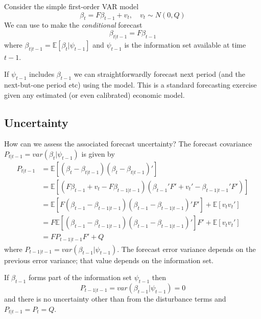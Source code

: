 \documentclass[
  letterpaper,
]{book}
\begin{document}
Consider the simple first-order VAR model \begin{equation}
  \beta_t = F\beta_{t-1}+v_{t},\quad v_t\sim N(0,Q)
\end{equation} We can use to make the \emph{conditional} forecast
\begin{equation}
  \beta_{t|t-1} = F\beta_{t-1}
\end{equation} where \(\beta_{t|t-1}= \mathbb{E}[\beta_t|\psi_{t-1}]\)
and \(\psi_{t-1}\) is the information set available at time \(t-1\).

If \(\psi_{t-1}\) includes \(\beta_{t-1}\) we can straightforwardly
forecast next period (and the next-but-one period etc) using the model.
This is a standard forecasting exercise given any estimated (or even
calibrated) economic model.

\hypertarget{uncertainty}{%
\subsection{Uncertainty}\label{uncertainty}}

How can we assess the associated forecast uncertainty? The forecast
covariance \(P_{t|t-1} = var(\beta_t|\psi_{t-1})\) is given by
\begin{align*}
P_{t|t-1} &= \mathbb{E}\left[ (\beta_t - \beta_{t|t-1})(\beta_t-\beta_{t|t-1})'\right]   \\
  &= \mathbb{E}\left[ (F\beta_{t-1}+v_t-F\beta_{t-1|t-1}) \left(\beta_{t-1}'F'+v_t'-\beta_{t-1|t-1}'F'\right) \right] \\
&= \mathbb{E}\left[ F\left(\beta _{t-1}-\beta _{t-1|t-1}\right) \left( \beta_{t-1}-\beta _{t-1|t-1}\right) ' F' \right] + \mathbb{E}[v_t v_t'] \\
&= F\mathbb{E}\left[\left(\beta _{t-1}-\beta _{t-1|t-1}\right) \left( \beta_{t-1}-\beta _{t-1|t-1} \right)' \right] F' + \mathbb{E}[v_t v_t'] \\
&= FP_{t-1|t-1}F' + Q
\end{align*} where \(P_{t-1|t-1} = var(\beta_{t-1}|\psi_{t-1})\). The
forecast error variance depends on the previous error variance; that
value depends on the information set.

If \(\beta_{t-1}\) forms part of the information set \(\psi_{t-1}\) then
\begin{equation}
 P_{t-1|t-1} = var \left(\beta_{t-1}|\psi_{t-1}\right) = 0
\end{equation} and there is no uncertainty other than from the
disturbance terms and \(P_{t|t-1}=P_t=Q\).
\end{document}
